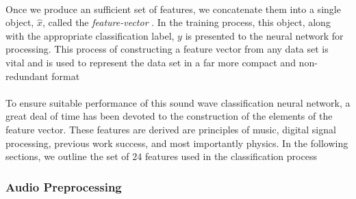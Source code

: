 \documentclass[12pt,letterpaper]{article}
\begin{document}
\paragraph*{}Once we produce an sufficient set of features, we concatenate them into a single object, $\hat{x}$, called the \textit{feature-vector} \cite{Goodfellow}. In the training process, this object, along with the appropriate classification label, $y$ is presented to the neural network for processing. This process of constructing a feature vector from any data set is vital and is used to represent the data set in a far more compact and non-redundant format \cite{Virtanen,Liu}

\paragraph*{}To ensure suitable performance of this sound wave classification neural network, a great deal of time has been devoted to the construction of the elements of the feature vector. These features are derived are principles of music, digital signal processing, previous work success, and most importantly physics. In the following sections, we outline the set of $24$ features used in the classification process

\newpage

\subsubsection{Audio Preprocessing}
\end{document}
